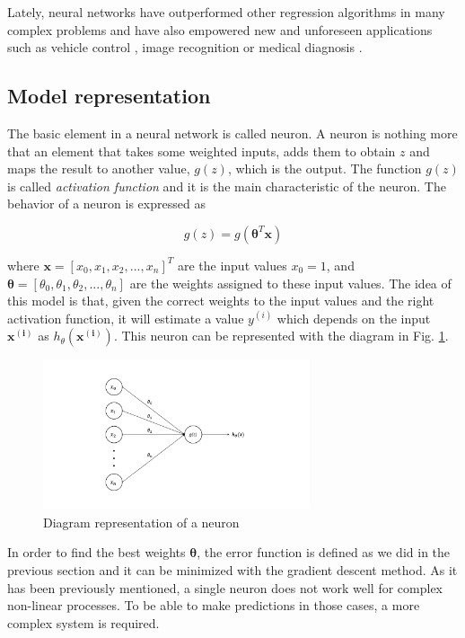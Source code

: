 \documentclass[a4paper, report, oneside, UKenglish]{memoir}
\newcommand{\x}{\boldsymbol{x}}
\newcommand{\btheta}{\boldsymbol{\theta}}
\begin{document}
Lately, neural networks have outperformed other regression algorithms in many complex problems and have also empowered new and unforeseen applications such as vehicle control \cite{BojarskiTDFFGJM16}, image recognition \cite{hijazi2015} or medical diagnosis \cite{AMATO201347}.

\subsection{Model representation}
The basic element in a neural network is called neuron. A neuron is nothing more that an element that takes some weighted inputs, adds them to obtain $z$ and maps the result to another value, $g(z)$, which is the output. The function $g(z)$ is called \textit{activation function} and it is the main characteristic of the neuron. The behavior of a neuron is expressed as

\begin{equation}
    g(z) = g(\btheta^T\boldsymbol{x})
\end{equation}

where $\x = [x_0, x_1, x_2, ..., x_n]^T$ are the input values $x_0 = 1$, and $\btheta = [\theta_0, \theta_1, \theta_2, ..., \theta_n]$ are the weights assigned to these input values. The idea of this model is that, given the correct weights to the input values and the right activation function, it will estimate a value $y^{(i)}$ which depends on the input $\boldsymbol{x^{(i)}}$ as $h_\theta(\boldsymbol{x^{(i)}})$. This neuron can be represented with the diagram in Fig. \ref{fig:neuron_diag}. 

\begin{figure}[ht]
    \centering
    \includegraphics[width=0.7\textwidth]{figures/fitting/neuron_diagram.png}
    \caption{Diagram representation of a neuron}
    \label{fig:neuron_diag}
\end{figure}

In order to find the best weights $\btheta$, the error function is defined as we did in the previous section and it can be minimized with the gradient descent method. As it has been previously mentioned, a single neuron does not work well for complex non-linear processes. To be able to make predictions in those cases, a more complex system is required. 
\end{document}
